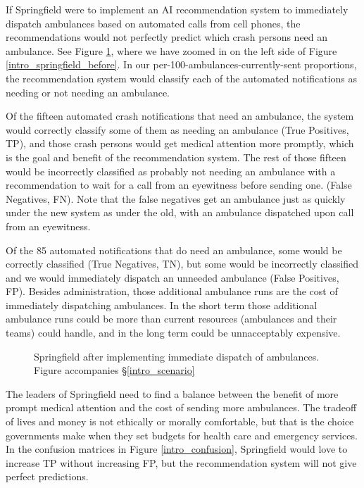 \FloatBarrier

If Springfield were to implement an AI recommendation system to immediately dispatch ambulances based on automated calls from cell phones, the recommendations would not perfectly predict which crash persons need an ambulance.    See Figure \ref{intro_springfield_after}, where we have zoomed in on the left side of Figure \ref{intro_springfield_before}. In our per-100-ambulances-currently-sent proportions, the recommendation system would classify each of the automated notifications as needing or not needing an ambulance.  

Of the fifteen automated crash notifications that need an ambulance, the system would correctly classify some of them as needing an ambulance (True Positives, TP), and those crash persons would get medical attention more promptly, which is the goal and benefit of the recommendation system.  The rest of those fifteen would be incorrectly classified as probably not needing an ambulance with a recommendation to wait for a call from an eyewitness before sending one. (False Negatives, FN).  Note that the false negatives get an ambulance just as quickly under the new system as under the old,  with an ambulance dispatched upon call from an eyewitness.  

Of the 85 automated notifications that do need an ambulance, some would be correctly classified (True Negatives, TN), but some would be incorrectly classified and we would immediately dispatch an unneeded ambulance (False Positives, FP).  Besides administration, those additional ambulance runs are the cost of immediately dispatching ambulances.  In the short term those additional ambulance runs could be more than current resources (ambulances and their teams) could handle, and in the long term could be unnacceptably expensive.  

\begin{figure}[h]
	
\caption{\normalfont\normalsize Springfield after implementing immediate dispatch of ambulances.  Figure accompanies \S\ref{intro_scenario}}
\label{intro_springfield_after}
\end{figure}

\FloatBarrier

The leaders of Springfield need to find a balance between the benefit of more prompt medical attention and the cost of sending more ambulances.  The tradeoff of lives and money is not ethically or morally comfortable, but that is the choice governments make when they set budgets for health care and emergency services.  In the confusion matrices in Figure \ref{intro_confusion}, Springfield would love to increase TP without increasing FP, but the recommendation system will not give perfect predictions.  

